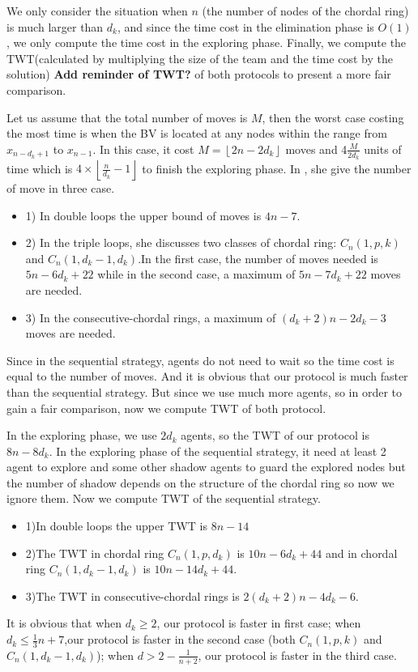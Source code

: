  

 
 

We only consider the situation when $n$ (the number of nodes of the chordal ring) is much larger than $d_k$, and since the time cost in the elimination phase is $O(1)$, we only compute the time cost in the exploring phase. Finally, we compute the TWT(calculated by multiplying the size of the team and the time cost by the solution) {\bf Add reminder of TWT? }of both protocols to present a more fair comparison.

Let us assume that the total number of moves is $M$, then the worst case costing the most time is when the BV is located at any nodes within the range from $x_{n-d_k+1}$ to $x_{n-1}$. In this case, it cost $M=\left \lfloor 2n-2d_k\right \rfloor$ moves and 4$\frac{M}{2d_k}$ units of time which is $4\times \left \lfloor \frac{n}{d_k}-1\right \rfloor$ to finish the exploring phase. 
In \cite{Alotaibi}, she give the number of move in three case.
\begin{itemize}
\item 1) In double loops the upper bound of moves is $4n-7$.
\item 2) In the triple loops, she discusses two classes of chordal ring: $C_n(1,p,k)$ and $C_n(1,d_k-1,d_k)$.In the first case, the number of moves needed is $5n-6d_k+22$ while in the second case, a maximum of $5n-7d_k+22$ moves are needed.
\item 3) In the consecutive-chordal rings, a maximum of $(d_k+2)n-2d_k-3$ moves are needed.
\end{itemize}
Since in the sequential strategy, agents do not need to wait so the time cost is equal to the number of moves. And it is obvious that our protocol is much faster than the sequential strategy. But since we use much more agents, so in order to gain a fair comparison, now we compute TWT of both protocol.

In the exploring phase, we use $2d_k$ agents, so the TWT of our protocol is $8n-8d_k$. In the exploring phase of the sequential strategy, it need at least 2 agent to explore and some other shadow agents to guard the explored nodes but the number of shadow depends on the structure of the chordal ring so now we ignore them. Now we compute TWT of the sequential strategy.
\begin{itemize}
\item 1)In double loops the upper TWT is $8n-14$
\item 2)The TWT in chordal ring $C_n(1,p,d_k)$ is $10n-6d_k+44$ and in chordal ring $C_n(1,d_k-1,d_k)$ is $10n-14d_k+44$.
\item 3)The TWT in consecutive-chordal rings is $2(d_k+2)n-4d_k-6$.
\end{itemize}
It is obvious that when $d_k\geq 2$, our protocol is faster in first case; when $d_k\leq \frac{1}{3}n+7$,our protocol is faster in the second case (both $C_n(1,p,k)$ and $C_n(1,d_k-1,d_k)$); when $d>2-\frac{1}{n+2}$, our protocol is faster in the third case.

